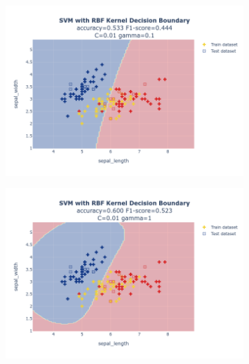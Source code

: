 \documentclass{article}
\begin{document}
\begin{figure}
\begin{subfigure}{0.3\textwidth}
        \includegraphics[scale=.13]{images/implementation/q1/rbf_kernel/sepal_length_sepal_width_0.01_0.1.png}
    \end{subfigure}
    \hfill
    \begin{subfigure}{0.3\textwidth}
        \centering
        \includegraphics[scale=.13]{images/implementation/q1/rbf_kernel/sepal_length_sepal_width_0.01_1.png}
    \end{subfigure}
    \hfill
    \begin{subfigure}{0.3\textwidth}
        \centering

\end{subfigure}
\end{figure}
\end{document}
